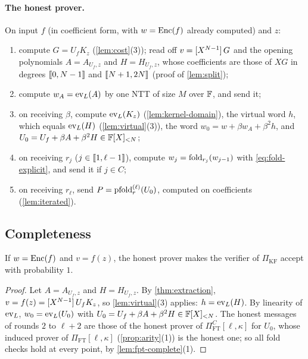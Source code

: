 \paragraph{The honest prover.}
On input $f$ (in coefficient form, with $w = \mathrm{Enc}(f)$ already computed) and $z$:
\begin{enumerate}
  \item compute $G = U_f K_z$ (\cref{lem:cost}(3)); read off $v = [X^{N-1}]\,G$ and the opening polynomials $A = A_{U_f,z}$ and $H = H_{U_f,z}$, whose coefficients are those of $XG$ in degrees $\llbracket 0, N-1 \rrbracket$ and $\llbracket N+1, 2N \rrbracket$ (proof of \cref{lem:split});
  \item compute $w_A = \mathrm{ev}_L(A)$ by one NTT of size $M$ over $\mathbb{F}$, and send it;
  \item on receiving $\beta$, compute $\mathrm{ev}_L(K_z)$ (\cref{lem:kernel-domain}), the virtual word $h$, which equals $\mathrm{ev}_L(H)$ (\cref{lem:virtual}(3)), the word $w_0 = w + \beta w_A + \beta^2 h$, and $U_0 = U_f + \beta A + \beta^2 H \in \mathbb{F}[X]_{<N}$;
  \item on receiving $r_j$ ($j \in \llbracket 1, \ell-1 \rrbracket$), compute $w_j = \mathrm{fold}_{r_j}(w_{j-1})$ with \eqref{eq:fold-explicit}, and send it if $j \in C$;
  \item on receiving $r_\ell$, send $P = \mathrm{pfold}^{(\ell)}_r(U_0)$, computed on coefficients (\cref{lem:iterated}).
\end{enumerate}

\subsection{Completeness}\label{sec:scheme:complete}

\begin{theorem}[Completeness]\label{thm:complete}
If $w = \mathrm{Enc}(f)$ and $v = f(z)$, the honest prover makes the verifier of $\Pi_{\mathrm{KF}}$ accept with probability $1$.
\end{theorem}

\begin{proof}
Let $A = A_{U_f,z}$ and $H = H_{U_f,z}$. By \cref{thm:extraction}, $v = f(z) = [X^{N-1}]\,U_f K_z$, so \cref{lem:virtual}(3) applies: $h = \mathrm{ev}_L(H)$.
By linearity of $\mathrm{ev}_L$, $w_0 = \mathrm{ev}_L(U_0)$ with $U_0 = U_f + \beta A + \beta^2 H \in \mathbb{F}[X]_{<N}$.
The honest messages of rounds $2$ to $\ell+2$ are those of the honest prover of $\Pi^C_{\mathrm{FT}}[\ell,\kappa]$ for $U_0$, whose induced prover of $\Pi_{\mathrm{FT}}[\ell,\kappa]$ (\cref{prop:arity}(1)) is the honest one; so all fold checks hold at every point, by \cref{lem:fpt-complete}(1).
\end{proof}

